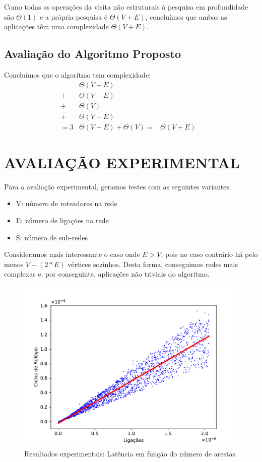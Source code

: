 \documentclass[a4paper, 12pt, conference, portuguese]{ieeeconf}
\begin{document}
Como todas as operações da visita não estruturais à pesquisa em profundidade são
$\Theta(1)$ e a própria pesquisa é $\Theta(V + E)$, concluímos que ambas as
aplicações têm uma complexidade $\Theta(V + E)$.

\subsection{Avaliação do Algoritmo Proposto}
Concluímos que o algoritmo tem complexidade:
\begin{align*}
  &\Theta(V + E) && \tag{Construção do Grafo}\\
  + &\Theta(V + E) && \tag{Aplicação 1ª DFS}\\
  + &\Theta(V) && \tag{Rem. P. de Articulação}\\
  + &\Theta(V + E) && \tag{Aplicação 2ª DFS}\\
  = 3&\Theta(V + E) + \Theta(V)
  = &\Theta(V + E)
\end{align*}

\section{AVALIAÇÃO EXPERIMENTAL}\label{experimental}
Para a avaliação experimental, geramos testes com as seguintes variantes.
\begin{itemize}
  \item V: número de roteadores na rede
  \item E: número de ligações na rede
  \item S: número de sub-redes
\end{itemize}

Consideramos mais interessante o caso onde $E > V$, pois no caso contrário há
pelo menos $V - (2 * E)$ vértices sozinhos. Desta forma, conseguimos redes mais
complexas e, por conseguinte, aplicações não triviais do algoritmo.

\begin{figure}[t]
  \centering
  \includegraphics[width=1.0\linewidth]{analysis}
  \caption{Resultados experimentais: Latência em função do número de arestas}
  \label{res}
\end{figure}
\end{document}
